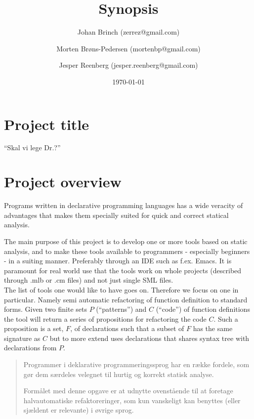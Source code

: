 \documentclass[a4paper,oneside]{memoir}
\title{Synopsis}
\author{Johan Brinch (zerrez@gmail.com) \and
Morten Brøns-Pedersen (mortenbp@gmail.com) \and
Jesper Reenberg (jesper.reenberg@gmail.com)}
\date{\today}
\begin{document}
\maketitle

\section{Project title}

``Skal vi lege Dr.?''

\section{Project overview}

Programs written in declarative programming languages has a wide veracity of
advantages that makes them specially suited for quick and correct statical
analysis.


The main purpose of this project is to develop one or more tools based on static analysis, and to
make these tools available to programmers - especially beginners - in a suiting manner. Preferably
through an IDE such as f.ex. Emacs. It is paramount for real world use that the tools work on whole
projects (described through .mlb or .cm files) and not just single SML files.\\

The list of tools one would like to have goes on. Therefore we focus on one in particular. Namely
semi automatic refactoring of function definition to standard forms. Given two finite sets $P$
(``patterns'') and $C$ (``code'') of function definitions the tool will return a series of
propositions for refactoring the code $C$. Such a proposition is a set, $F$, of declarations such that a
subset of $F$ has the same signature as $C$ but to more extend uses declarations that shares syntax tree
with declarations from $P$.



\begin{quotation}
  Programmer i deklarative programmeringssprog har en række fordele, som gør dem
  særdeles velegnet til hurtig og korrekt statisk analyse.

  Formålet med denne opgave er at udnytte ovenstående til at foretage
  halvautomatiske refaktoreringer, som kun vanskeligt kan benyttes (eller
  sjældent er relevante) i øvrige sprog.
\end{quotation}
\end{document}
